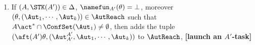 \smallskip
\fbox
{
\begin{minipage}{0.9\textwidth}
\begin{enumerate}
    \item If $(A,\STK(A')) \in\Delta$, $\namefun_{A'}(\theta) = \bot$, moreover $(\theta, (\Aut_1,\cdots,\Aut_k)) \in \AutReach$ such that $A\act^*\cap\ConfSet(\Aut_1)\neq \emptyset$, 
        then adds the tuple $(\aft(A')\theta, (\Aut_{A'}^{A'},\Aut_1,\cdots,\Aut_k))$ to $\AutReach$,
        \textbf{[launch an $A'$-task]}


\end{enumerate}
\end{minipage}}
